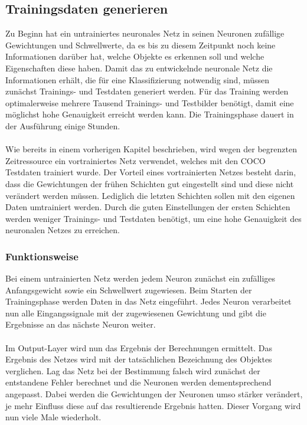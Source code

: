 \documentclass[a4paper,12pt,oneside]{article}
\begin{document}
\subsection{Trainingsdaten generieren} 
Zu Beginn hat ein untrainiertes neuronales Netz in seinen Neuronen zufällige Gewichtungen und Schwellwerte, da es bis zu diesem Zeitpunkt noch keine Informationen darüber hat, welche Objekte es erkennen soll und welche Eigenschaften diese haben. Damit das zu entwickelnde neuronale Netz die Informationen erhält, die für eine Klassifizierung notwendig sind, müssen zunächst Trainings- und Testdaten generiert werden. Für das Training werden optimalerweise mehrere Tausend Trainings- und Testbilder benötigt, damit eine möglichst hohe Genauigkeit erreicht werden kann. Die Trainingsphase dauert in der Ausführung einige Stunden. 
\\
\\
Wie bereits in einem vorherigen Kapitel beschrieben, wird wegen der begrenzten Zeitressource ein vortrainiertes Netz verwendet, welches mit den COCO Testdaten trainiert wurde. Der Vorteil eines vortrainierten Netzes besteht darin, dass die Gewichtungen der frühen Schichten gut eingestellt sind und diese nicht verändert werden müssen. Lediglich die letzten Schichten sollen mit den eigenen Daten umtrainiert werden. Durch die guten Einstellungen der ersten Schichten werden weniger Trainings- und Testdaten benötigt, um eine hohe Genauigkeit des neuronalen Netzes zu erreichen.

\subsubsection{Funktionsweise}
Bei einem untrainierten Netz werden jedem Neuron zunächst ein zufälliges Anfangsgewicht sowie ein Schwellwert zugewiesen. Beim Starten der Trainingsphase werden Daten in das Netz eingeführt. Jedes Neuron verarbeitet nun alle Eingangssignale mit der zugewiesenen Gewichtung und gibt die Ergebnisse an das nächste Neuron weiter. 
\\
\\
Im Output-Layer wird nun das Ergebnis der Berechnungen ermittelt. Das Ergebnis des Netzes wird mit der tatsächlichen Bezeichnung des Objektes verglichen. Lag das Netz bei der Bestimmung falsch wird zunächst der entstandene Fehler berechnet und die Neuronen werden dementsprechend angepasst. Dabei werden die Gewichtungen der Neuronen umso stärker verändert, je mehr Einfluss diese auf das resultierende Ergebnis hatten. Dieser Vorgang wird nun viele Male wiederholt.
  
\end{document}
